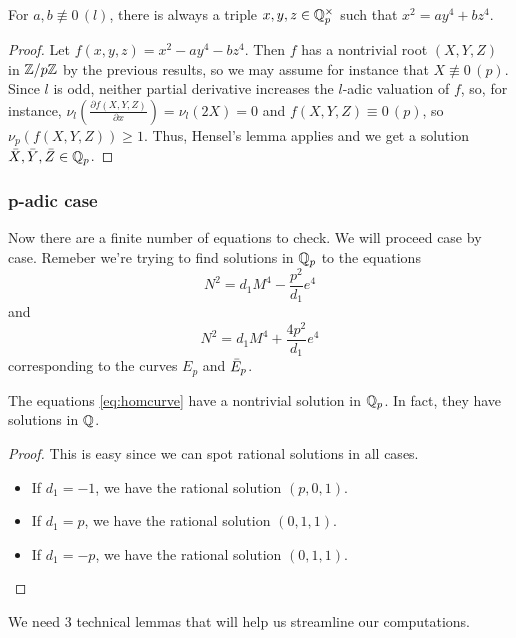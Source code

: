 \documentclass[12pt, a4paper]{amsart}
\begin{document}
\begin{thm}
  For $a, b \not\equiv 0 \, (l)$, there is always a triple
  $x, y, z \in {\mathbb Q}_p^{\times}$ such that $x^2 = ay^4 + bz^4$.
\end{thm}
\begin{proof}
  Let $f(x,y,z) = x^2 - ay^4 - bz^4$. Then $f$ has a nontrivial root
  $(X,Y,Z)$ in ${\mathbb Z}/p{\mathbb Z}$ by the previous results, so we may assume for instance
  that $X \not\equiv 0 \, (p)$.
  Since $l$ is odd, neither partial derivative increases the $l$-adic valuation
  of $f$, so, for instance, $\nu_l(\frac{\partial f(X,Y,Z)}{\partial x}) =
  \nu_l(2X) = 0$ and $f(X,Y,Z) \equiv 0 \, (p)$, so $\nu_p(f(X,Y,Z)) \geq 1$.
  Thus, Hensel's lemma applies and we get a solution $\bar{X}, \bar{Y}, \bar{Z}
  \in {\mathbb Q}_p$. 
\end{proof}
  
\subsubsection{p-adic case}
Now there are a finite number of equations to check. We will proceed case by
case. Remeber we're trying to find solutions in ${\mathbb Q}_p$ to the equations
\begin{equation} \label{eq:homcurve}
  N^2 = d_1 M^4 - \frac{p^2}{d_1}e^4
\end{equation}
and
\begin{equation} \label{eq:isocurve}
  N^2 = d_1 M^4 + \frac{4p^2}{d_1}e^4
\end{equation}
corresponding to the curves $E_p$ and $\bar{E}_p$.

\begin{thm}
  The equations \ref{eq:homcurve} have a nontrivial solution in ${\mathbb Q}_p$. In fact,
  they have solutions in ${\mathbb Q}$.
\end{thm}
\begin{proof} This is easy since we can spot rational solutions in all cases.
   
  \begin{itemize}
  \item If $d_1 = -1$, we have the rational solution $(p, 0, 1)$.
  \item If $d_1 = p$, we have the rational solution $(0, 1, 1)$.
  \item If $d_1 = -p$, we have the rational solution $(0, 1, 1)$.
  \end{itemize}
\end{proof}

We need 3 technical lemmas that will help us streamline our computations.
\end{document}
